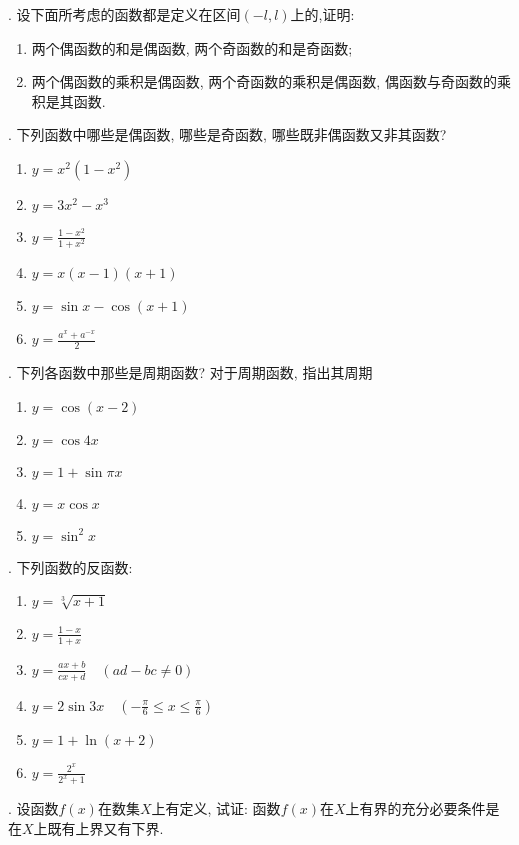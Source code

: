 \begin{task}{}
  . 设下面所考虑的函数都是定义在区间$(-l, l)$上的,证明:
  \begin{enumerate}
    \renewcommand{\labelenumi}{(\theenumi)}
  \item
    两个偶函数的和是偶函数, 两个奇函数的和是奇函数;
  \item
    两个偶函数的乘积是偶函数, 两个奇函数的乘积是偶函数, 偶函数与奇函数的乘积是其函数.
  \end{enumerate}
  . 下列函数中哪些是偶函数, 哪些是奇函数, 哪些既非偶函数又非其函数?
  \begin{multicols}{2}
    \begin{enumerate}
      \renewcommand{\labelenumi}{(\theenumi)}
    \item
      $y=x^2(1-x^2)$
    \item
      $y=3x^2-x^3$
    \item
      $y=\frac{1-x^2}{1+x^2}$
    \item
      $y=x(x-1)(x+1)$
    \item
      $y=\sin x-\cos{(x+1)}$
    \item
      $y=\frac{a^{x}+a^{-x}}{2}$
    \end{enumerate}
  \end{multicols}
  . 下列各函数中那些是周期函数? 对于周期函数, 指出其周期
  \begin{multicols}{2}
    \begin{enumerate}
      \renewcommand{\labelenumi}{(\theenumi)}
    \item
      $y=\cos{(x-2)}$
    \item
      $y=\cos{4x}$
    \item
      $y=1 + \sin\pi x$
    \item
      $y=x\cos x$
    \item
      $y=\sin^2 x$
    \end{enumerate}
  \end{multicols}
  . 下列函数的反函数:
  \begin{multicols}{2}
    \begin{enumerate}
      \renewcommand{\labelenumi}{(\theenumi)}
    \item
      $y=\sqrt[3]{x + 1}$
    \item
      $y=\frac{1 - x}{1 + x}$
    \item
      $y=\frac{ax + b}{cx + d}\quad(ad - bc \neq 0)$
    \item
      $y=2\sin{3x}\quad(-\frac{\pi}{6}\leq x \leq \frac{\pi}{6})$
    \item
      $y=1 + \ln (x + 2)$
    \item
      $y=\frac{2^x}{2^x + 1}$
    \end{enumerate}
  \end{multicols}
  . 设函数$f(x)$在数集$X$上有定义, 试证: 函数$f(x)$在$X$上有界的充分必要条件是在$X$上既有上界又有下界.


\end{task}
